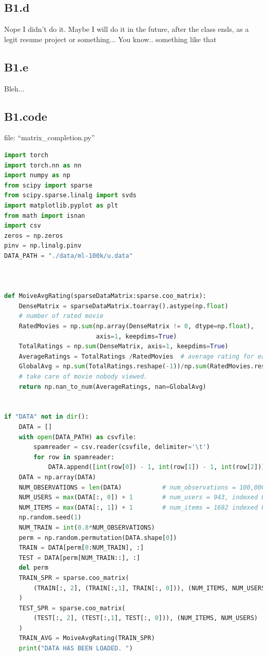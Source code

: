 \documentclass[]{article}
\begin{document}
    \subsection*{B1.d}
        Nope I didn't do it. Maybe I will do it in the future, after the class ends, as a legit resume project or something... You know.. something like that 
    \subsection*{B1.e}
        Bleh... 
    \subsection*{B1.code}\label{B1.code}
        file: ``matrix\_completion.py''
        \begin{lstlisting}[language=python]
import torch
import torch.nn as nn
import numpy as np
from scipy import sparse
from scipy.sparse.linalg import svds
import matplotlib.pyplot as plt
from math import isnan
import csv
zeros = np.zeros
pinv = np.linalg.pinv
DATA_PATH = "./data/ml-100k/u.data"



def MoiveAvgRating(sparseDataMatrix:sparse.coo_matrix):
    DenseMatrix = sparseDataMatrix.toarray().astype(np.float)
    # number of rated movie
    RatedMovies = np.sum(np.array(DenseMatrix != 0, dtype=np.float),
                         axis=1, keepdims=True)
    TotalRatings = np.sum(DenseMatrix, axis=1, keepdims=True)
    AverageRatings = TotalRatings /RatedMovies  # average rating for each movie
    GlobalAvg = np.sum(TotalRatings.reshape(-1))/np.sum(RatedMovies.reshape(-1))
    # take care of movie nobody viewed.
    return np.nan_to_num(AverageRatings, nan=GlobalAvg)


if "DATA" not in dir():
    DATA = []
    with open(DATA_PATH) as csvfile:
        spamreader = csv.reader(csvfile, delimiter='\t')
        for row in spamreader:
            DATA.append([int(row[0]) - 1, int(row[1]) - 1, int(row[2])])
    DATA = np.array(DATA)
    NUM_OBSERVATIONS = len(DATA)           # num_observations = 100,000
    NUM_USERS = max(DATA[:, 0]) + 1        # num_users = 943, indexed 0,...,942
    NUM_ITEMS = max(DATA[:, 1]) + 1        # num_items = 1682 indexed 0,...,1681
    np.random.seed(1)
    NUM_TRAIN = int(0.8*NUM_OBSERVATIONS)
    perm = np.random.permutation(DATA.shape[0])
    TRAIN = DATA[perm[0:NUM_TRAIN], :]
    TEST = DATA[perm[NUM_TRAIN::], :]
    del perm
    TRAIN_SPR = sparse.coo_matrix(
        (TRAIN[:, 2], (TRAIN[:,1], TRAIN[:, 0])), (NUM_ITEMS, NUM_USERS)
    )
    TEST_SPR = sparse.coo_matrix(
        (TEST[:, 2], (TEST[:,1], TEST[:, 0])), (NUM_ITEMS, NUM_USERS)
    )
    TRAIN_AVG = MoiveAvgRating(TRAIN_SPR)
    print("DATA HAS BEEN LOADED. ")



\end{lstlisting}
\end{document}
